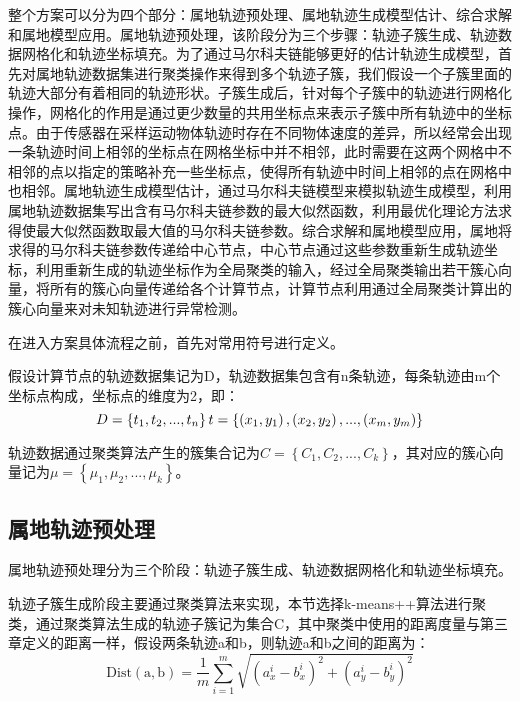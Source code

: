 整个方案可以分为四个部分：属地轨迹预处理、属地轨迹生成模型估计、综合求解和属地模型应用。属地轨迹预处理，该阶段分为三个步骤：轨迹子簇生成、轨迹数据网格化和轨迹坐标填充。为了通过马尔科夫链能够更好的估计轨迹生成模型，首先对属地轨迹数据集进行聚类操作来得到多个轨迹子簇，我们假设一个子簇里面的轨迹大部分有着相同的轨迹形状。子簇生成后，针对每个子簇中的轨迹进行网格化操作，网格化的作用是通过更少数量的共用坐标点来表示子簇中所有轨迹中的坐标点。由于传感器在采样运动物体轨迹时存在不同物体速度的差异，所以经常会出现一条轨迹时间上相邻的坐标点在网格坐标中并不相邻，此时需要在这两个网格中不相邻的点以指定的策略补充一些坐标点，使得所有轨迹中时间上相邻的点在网格中也相邻。属地轨迹生成模型估计，通过马尔科夫链模型来模拟轨迹生成模型，利用属地轨迹数据集写出含有马尔科夫链参数的最大似然函数，利用最优化理论方法求得使最大似然函数取最大值的马尔科夫链参数。综合求解和属地模型应用，属地将求得的马尔科夫链参数传递给中心节点，中心节点通过这些参数重新生成轨迹坐标，利用重新生成的轨迹坐标作为全局聚类的输入，经过全局聚类输出若干簇心向量，将所有的簇心向量传递给各个计算节点，计算节点利用通过全局聚类计算出的簇心向量来对未知轨迹进行异常检测。

在进入方案具体流程之前，首先对常用符号进行定义。

假设计算节点的轨迹数据集记为D，轨迹数据集包含有n条轨迹，每条轨迹由m个坐标点构成，坐标点的维度为2，即：
\[
D=\left\{ t_1,t_2,...,t_n \right\} 
\\
t=\left\{ \left( x_1,y_1 \right) ,\left( x_2,y_2 \right) ,...,\left( x_m,y_m \right) \right\} 
\]

轨迹数据通过聚类算法产生的簇集合记为$C=\left\{ C_1,C_2,...,C_k \right\} $，其对应的簇心向量记为$\mu =\left\{ \mu _1,\mu _2,...,\mu _k \right\} $。


\subsection{属地轨迹预处理}

属地轨迹预处理分为三个阶段：轨迹子簇生成、轨迹数据网格化和轨迹坐标填充。

轨迹子簇生成阶段主要通过聚类算法来实现，本节选择k-means++算法进行聚类，通过聚类算法生成的轨迹子簇记为集合C，其中聚类中使用的距离度量与第三章定义的距离一样，假设两条轨迹a和b，则轨迹a和b之间的距离为：
\[
\text{Dist}\left( \text{a},\text{b} \right) =\frac{1}{m}\sum_{i=1}^m{\sqrt{\left( a_{x}^{i}-b_{x}^{i} \right) ^2+\left( a_{y}^{i}-b_{y}^{i} \right) ^2}}
\]

